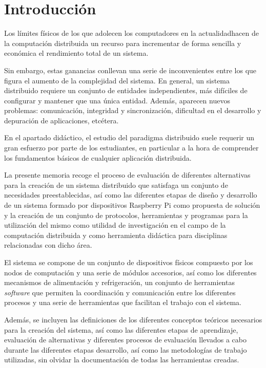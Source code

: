 \chapter{Introducción}

Los límites físicos de los que adolecen los computadores en la actualidad\citationneeded hacen de la computación distribuida un recurso para incrementar de forma sencilla y económica el rendimiento total de un sistema.%

Sin embargo, estas ganancias conllevan una serie de inconvenientes entre los que figura el aumento de la complejidad del sistema. En general, un sistema distribuido requiere un conjunto de entidades independientes, más difíciles de configurar y mantener que una única entidad. Además, aparecen nuevos problemas: comunicación, integridad y sincronización, dificultad en el desarrollo y depuración de aplicaciones, etcétera.

En el apartado didáctico, el estudio del paradigma distribuido suele requerir un gran esfuerzo por parte de los estudiantes, en particular a la hora de comprender los fundamentos básicos de cualquier aplicación distribuida.

La presente memoria recoge el proceso de evaluación de diferentes alternativas para la creación de un sistema distribuido que satisfaga un conjunto de necesidades preestablecidas, así como las diferentes etapas de diseño y desarrollo de un sistema formado por dispositivos Raspberry Pi como propuesta de solución y la creación de un conjunto de protocolos, herramientas y programas para la utilización del mismo como utilidad de investigación en el campo de la computación distribuida y como herramienta didáctica para disciplinas relacionadas con dicho área.

El sistema se compone de un conjunto de dispositivos físicos compuesto por los nodos de computación y una serie de módulos accesorios, así como los diferentes mecanismos de alimentación y refrigeración, un conjunto de herramientas \textit{software} que permiten la coordinación y comunicación entre los diferentes procesos y una serie de herramientas que facilitan el trabajo con el sistema.

Además, se incluyen las definiciones de los diferentes conceptos teóricos necesarios para la creación del sistema, así como las diferentes etapas de aprendizaje, evaluación de alternativas y diferentes procesos de evaluación llevados a cabo durante las diferentes etapas desarrollo, así como las metodologías de trabajo utilizadas, sin olvidar la documentación de todas las herramientas creadas.